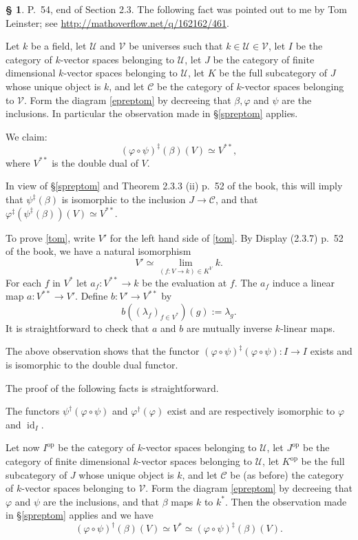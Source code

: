 \documentclass[12pt]{article}%
\theoremstyle{remark}
\theoremstyle{definition}
\newtheorem{s}[thm]{\S}%
\newcommand{\C}{\mathcal C}
\newcommand{\U}{\mathcal U}
\newcommand{\V}{\mathcal V}
\newcommand{\pp}{\varphi}
\DeclareMathOperator{\id}{id}
\DeclareMathOperator{\op}{op}
\begin{document}
\begin{s} 
P.~54, end of Section 2.3. The following fact was pointed out to me by Tom Leinster; see \href{http://mathoverflow.net/q/162162/461}{http://mathoverflow.net/q/162162/461}.

Let $k$ be a field, let $\U$ and $\V$ be universes such that $k\in\U\in\V$, let $I$ be the category of $k$-vector spaces belonging to $\U$, let $J$ be the category of finite dimensional $k$-vector spaces belonging to $\U$, let $K$ be the full subcategory of $J$ whose unique object is $k$, and let $\C$ be the category of $k$-vector spaces belonging to $\V$. Form the diagram \eqref{epreptom} by decreeing that $\beta,\pp$ and $\psi$ are the inclusions. In particular the observation made in \S\ref{spreptom} applies. 

We claim: 
\begin{equation}\label{tom}
(\pp\circ\psi)^\ddagger(\beta)(V)\simeq V^{**},
\end{equation} 
where $V^{**}$ is the double dual of $V$. 

In view of \S\ref{spreptom} and Theorem 2.3.3 (ii) p.~52 of the book, this will imply that $\psi^\ddagger(\beta)$ is isomorphic to the inclusion $J\to\C$, and that $\pp^\ddagger(\psi^\ddagger(\beta))(V)\simeq V^{**}$. 

To prove \eqref{tom}, write $V'$ for the left hand side of \eqref{tom}. By Display (2.3.7) p.~52 of the book, we have a natural isomorphism
$$
V'\simeq\lim_{(f:V\to k)\in K^V}k. 
$$ 
For each $f$ in $V^*$ let $a_f:V^{**}\to k$ be the evaluation at $f$. The $a_f$ induce a linear map $a:V^{**}\to V'$. Define $b:V'\to V^{**}$ by 
$$
b((\lambda_f)_{f\in V^*})(g):=\lambda_g.
$$ 
It is straightforward to check that $a$ and $b$ are mutually inverse $k$-linear maps. 

The above observation shows that the functor $(\pp\circ\psi)^\ddagger(\pp\circ\psi):I\to I$ exists and is isomorphic to the double dual functor. 

The proof of the following facts is straightforward. 

The functors $\psi^\dagger(\pp\circ\psi)$ and $\pp^\dagger(\pp)$ exist and are respectively isomorphic to $\pp$ and $\id_I$. 

Let now $I^{\op}$ be the category of $k$-vector spaces belonging to $\U$, let $J^{\op}$ be the category of finite dimensional $k$-vector spaces belonging to $\U$, let $K^{\op}$ be the full subcategory of $J$ whose unique object is $k$, and let $\C$ be (as before) the category of $k$-vector spaces belonging to $\V$. Form the diagram \eqref{epreptom} by decreeing that $\pp$ and $\psi$ are the inclusions, and that $\beta$ maps $k$ to $k^*$. Then the observation made in \S\ref{spreptom} applies and we have 
$$
(\pp\circ\psi)^\dagger(\beta)(V)\simeq V^*\simeq(\pp\circ\psi)^\ddagger(\beta)(V).
$$ 
\end{s}
\end{document}
